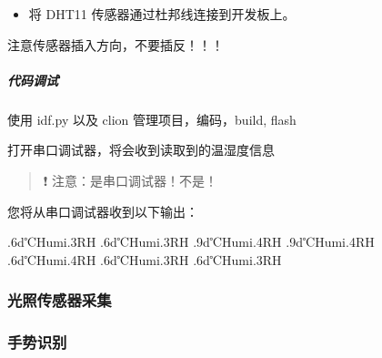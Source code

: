 \documentclass[a4paper,12pt,english]{sphinxmanual}
\begin{document}
{{\begin{itemize}
\item {} 
\sphinxAtStartPar
将 DHT11 传感器通过杜邦线连接到开发板上。

\end{itemize}

\sphinxAtStartPar
注意传感器插入方向，不要插反！！！


\subparagraph{代码调试}
\label{\detokenize{exp-esp32/peripherals/dht11:id8}}
\sphinxAtStartPar
使用 idf.py 以及 clion 管理项目，编码，build, flash

\sphinxAtStartPar
打开串口调试器，将会收到读取到的温湿度信息
\begin{quote}

\sphinxAtStartPar
❗ 注意：是串口调试器！不是！
\end{quote}

\sphinxAtStartPar
您将从串口调试器收到以下输出：

\begin{sphinxVerbatim}[commandchars=\\\{\}]
.6d℃\PYGZhy{}\PYGZhy{}Humi.3\PYGZpc{}RH
.6d℃\PYGZhy{}\PYGZhy{}Humi.3\PYGZpc{}RH
.9d℃\PYGZhy{}\PYGZhy{}Humi.4\PYGZpc{}RH
.9d℃\PYGZhy{}\PYGZhy{}Humi.4\PYGZpc{}RH
.6d℃\PYGZhy{}\PYGZhy{}Humi.4\PYGZpc{}RH
.6d℃\PYGZhy{}\PYGZhy{}Humi.3\PYGZpc{}RH
.6d℃\PYGZhy{}\PYGZhy{}Humi.3\PYGZpc{}RH
\end{sphinxVerbatim}

\sphinxstepscope


\subsubsection{光照传感器采集}
\label{\detokenize{exp-esp32/peripherals/light:id1}}\label{\detokenize{exp-esp32/peripherals/light::doc}}
\sphinxstepscope


\subsubsection{手势识别}
\label{\detokenize{exp-esp32/peripherals/gesture:id1}}\label{\detokenize{exp-esp32/peripherals/gesture::doc}}
\sphinxstepscope


}}
\end{document}

